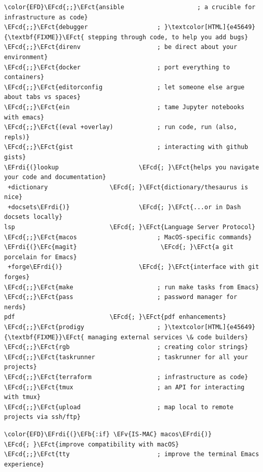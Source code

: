 \documentclass{scrartcl}
\newcommand{\EFb}[1]{\textcolor{EFb}{#1}} %
\newcommand{\EFct}[1]{\textcolor{EFct}{#1}} %
\newcommand{\EFc}[1]{\textcolor{EFc}{#1}} %
\newcommand{\EFv}[1]{\textcolor{EFv}{#1}} %
\newcommand{\EFcd}[1]{\textcolor{EFcd}{#1}} %
\newcommand{\EFrdi}[1]{\textcolor{EFrdi}{#1}} %
\begin{document}
\begin{enumerate}
\begin{Code}
\begin{Verbatim}[]
\color{EFD}\EFcd{;;}\EFct{ansible                    ; a crucible for infrastructure as code}
\EFcd{;;}\EFct{debugger                   ; }\textcolor[HTML]{e45649}{\textbf{FIXME}}\EFct{ stepping through code, to help you add bugs}
\EFcd{;;}\EFct{direnv                     ; be direct about your environment}
\EFcd{;;}\EFct{docker                     ; port everything to containers}
\EFcd{;;}\EFct{editorconfig               ; let someone else argue about tabs vs spaces}
\EFcd{;;}\EFct{ein                        ; tame Jupyter notebooks with emacs}
\EFcd{;;}\EFct{(eval +overlay)            ; run code, run (also, repls)}
\EFcd{;;}\EFct{gist                       ; interacting with github gists}
\EFrdi{(}lookup                      \EFcd{; }\EFct{helps you navigate your code and documentation}
 +dictionary                 \EFcd{; }\EFct{dictionary/thesaurus is nice}
 +docsets\EFrdi{)}                   \EFcd{; }\EFct{...or in Dash docsets locally}
lsp                          \EFcd{; }\EFct{Language Server Protocol}
\EFcd{;;}\EFct{macos                      ; MacOS-specific commands}
\EFrdi{(}\EFc{magit}                       \EFcd{; }\EFct{a git porcelain for Emacs}
 +forge\EFrdi{)}                     \EFcd{; }\EFct{interface with git forges}
\EFcd{;;}\EFct{make                       ; run make tasks from Emacs}
\EFcd{;;}\EFct{pass                       ; password manager for nerds}
pdf                          \EFcd{; }\EFct{pdf enhancements}
\EFcd{;;}\EFct{prodigy                    ; }\textcolor[HTML]{e45649}{\textbf{FIXME}}\EFct{ managing external services \& code builders}
\EFcd{;;}\EFct{rgb                        ; creating color strings}
\EFcd{;;}\EFct{taskrunner                 ; taskrunner for all your projects}
\EFcd{;;}\EFct{terraform                  ; infrastructure as code}
\EFcd{;;}\EFct{tmux                       ; an API for interacting with tmux}
\EFcd{;;}\EFct{upload                     ; map local to remote projects via ssh/ftp}
\end{Verbatim}
\end{Code}

\begin{Code}
\begin{Verbatim}[]
\color{EFD}\EFrdi{(}\EFb{:if} \EFv{IS-MAC} macos\EFrdi{)}           \EFcd{; }\EFct{improve compatibility with macOS}
\EFcd{;;}\EFct{tty                        ; improve the terminal Emacs experience}
\end{Verbatim}
\end{Code}


\end{enumerate}
\end{document}
